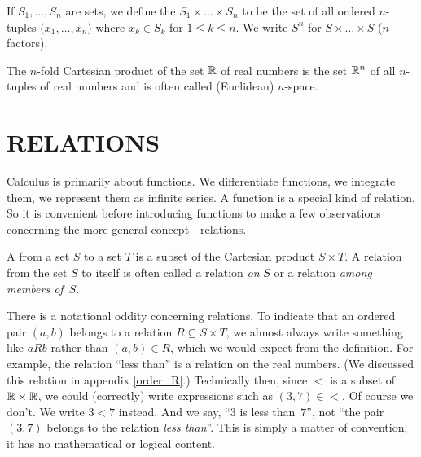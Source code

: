 \begin{defn} If $S_1,\dots,S_n$ are sets, we define the
 $S_1 \times \dots \times S_n$ to be the set of all ordered
$n$-tuples $\bigl(x_1,\dots,x_n)$ where $x_k \in S_k$  for $1 \le k \le n$.  We write
$S^n$ for $S \times \dots \times S$ ($n$ factors).
\end{defn}

\begin{exam}  The $n$-fold Cartesian product of the set $\mathbb{R}$ of real numbers is the set
$\mathbb{R}^n$ of all $n$-tuples of real numbers and is often called (Euclidean) $n$-space.
\end{exam}







\section{RELATIONS}  Calculus is primarily about functions.  We differentiate functions,
we integrate them, we represent them as infinite series.  A function is a special kind of
relation.  So it is convenient before introducing functions to make a few observations
concerning the more general concept---relations.

\begin{defn} A
 from a set $S$ to a set $T$ is a subset of the Cartesian product $S \times T$. A
relation from the set $S$ to itself is often called a relation \emph{on} $S$ or a relation
\emph{among members of}~$S$.
\end{defn}

There is a notational oddity concerning relations.  To indicate that an ordered pair $(a,b)$
belongs to a relation $R \subseteq S \times T$, we almost always write something like $aRb$
rather than $(a,b) \in R$, which we would expect from the definition.  For example, the
relation ``less than'' is a relation on the real numbers.  (We discussed this relation in
appendix \ref{order_R}.) Technically then, since $<$ is a subset of $\mathbb{R} \times \mathbb{R}$, we could
(correctly) write expressions such as $(3,7) \in <$.  Of course we don't.  We write $3<7$
instead.  And we say, ``$3$ is less than~$7$'', not ``the pair $(3,7)$ belongs to the relation
\emph{less than}''.   This is simply a matter of convention; it has no mathematical or logical
content.









